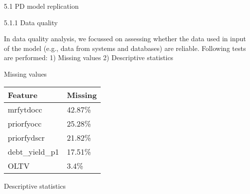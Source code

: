 5.1 PD model replication

5.1.1 Data quality

In data quality analysis, we focussed on assessing whether the data used
in input of the model (e.g., data from systems and databases) are
reliable. Following tests are performed: 1) Missing values 2)
Descriptive statistics

Missing values

\begin{longtable}[]{@{}ll@{}}
\toprule
Feature & Missing\tabularnewline
\midrule
\endhead
mrfytdocc & 42.87\%\tabularnewline
priorfyocc & 25.28\%\tabularnewline
priorfydscr & 21.82\%\tabularnewline
debt\_yield\_p1 & 17.51\%\tabularnewline
OLTV & 3.4\%\tabularnewline
\bottomrule
\end{longtable}

Descriptive statistics

